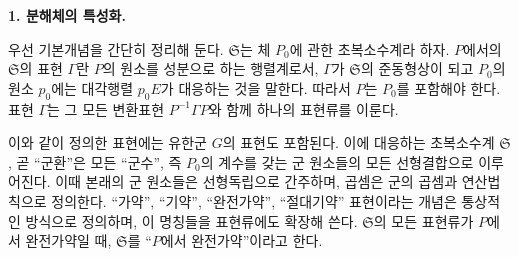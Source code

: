 \documentclass[11pt]{article}
\providecommand{\mS}{\mathfrak{S}}
\begin{document}
\begin{center}
\textbf{1. 분해체의 특성화.}
\end{center}

우선 기본개념을 간단히 정리해 둔다. $\mS$는 체 $P_0$에 관한 초복소수계라 하자. $P$에서의 $\mS$의 표현 $\Gamma$란 $P$의 원소를 성분으로 하는 행렬계로서, $\Gamma$가 $\mS$의 준동형상이 되고 $P_0$의 원소 $p_0$에는 대각행렬 $p_0E$가 대응하는 것을 말한다. 따라서 $P$는 $P_0$를 포함해야 한다. 표현 $\Gamma$는 그 모든 변환표현 $P^{-1}\Gamma P$와 함께 하나의 표현류를 이룬다.

이와 같이 정의한 표현에는 유한군 $G$의 표현도 포함된다. 이에 대응하는 초복소수계 $\mS$, 곧 ``군환''은 모든 ``군수'', 즉 $P_0$의 계수를 갖는 군 원소들의 모든 선형결합으로 이루어진다. 이때 본래의 군 원소들은 선형독립으로 간주하며, 곱셈은 군의 곱셈과 연산법칙으로 정의한다. ``가약'', ``기약'', ``완전가약'', ``절대기약'' 표현이라는 개념은 통상적인 방식으로 정의하며, 이 명칭들을 표현류에도 확장해 쓴다. $\mS$의 모든 표현류가 $P$에서 완전가약일 때, $\mS$를 ``$P$에서 완전가약''이라고 한다.
\end{document}
